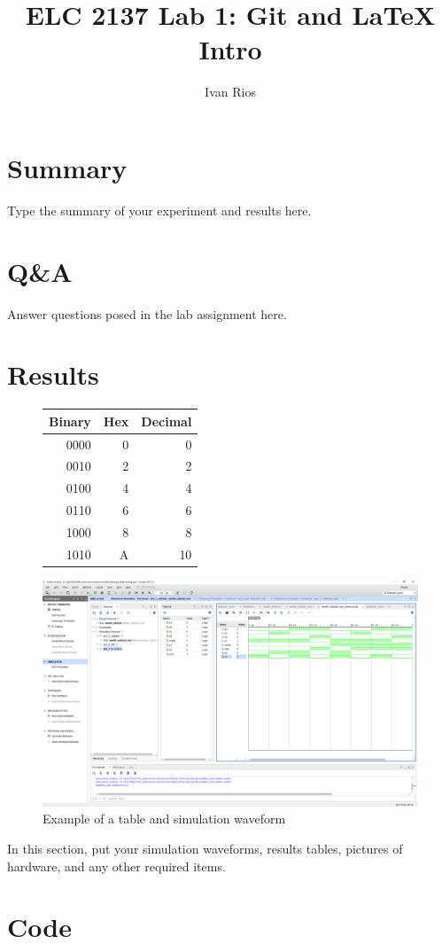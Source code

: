 \documentclass[11pt]{article}
\begin{document}
\title{ELC 2137 Lab 1: Git and LaTeX Intro}
\author{Ivan Rios}

\maketitle


\section*{Summary}

Type the summary of your  experiment and results here.  


\section*{Q\&A}

Answer questions posed in the lab assignment here.


\section*{Results}

\begin{figure}[ht]\centering
	\begin{tabular}{r|r|r}
		Binary & Hex & Decimal \\
		\midrule
		0000 & 0 & 0 \\
		0010 & 2 & 2 \\
	
		0100 & 4 & 4 \\
		0110 & 6 & 6 \\
		
		1000 & 8 & 8 \\
		1010 & A & 10 \\
		
		
		\bottomrule
	\end{tabular}\medskip



\includegraphics[scale=.5,trim={530 450 30 110},clip]{lab1_example_screenshot}
\caption{Example of a table and simulation waveform}
\end{figure}


In this section, put your simulation waveforms, results tables, pictures of hardware, and any other required items.





\section*{Code}
\end{document}
